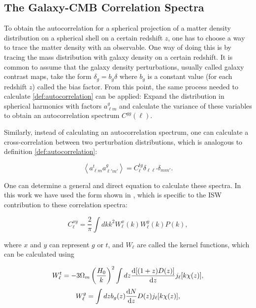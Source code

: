 \documentclass[openany,a4paper,12pt,oneside]{book}
\newcommand{\av}[1]{\left\langle #1 \right\rangle} %
\begin{document}
\begin{spacing}{1.5}
\subsection{The Galaxy-CMB Correlation Spectra}\label{ch2:correlations}

To obtain the autocorrelation for a spherical projection of a matter density distribution on a spherical shell on a certain redshift $z$, one has to choose a way to trace the matter density with an observable. One way of doing this is by tracing the mass distribution with galaxy density on a certain redshift. It is common to assume that the galaxy density perturbations, usually called galaxy contrast maps, take the form $\delta_g=b_g\delta$ where $b_g$ is a constant value (for each redshift $z$) called the bias factor. From this point, the same process needed to calculate \eqref{def:autocorrelation} can be applied: Expand the distribution in spherical harmonics with factors $a_{\ell m}^g$ and calculate the variance of these variables to obtain an autocorrelation spectrum $C^{gg}(\ell)$.

Similarly, instead of calculating an autocorrelation spectrum, one can calculate a cross-correlation between two perturbation distributions, which is analogous to definition \eqref{def:autocorrelation}:

\begin{equation}\label{av(ag, at)}
    \av{a_{\ell m}^ta_{\ell' m'}^g}=C^{tg}_\ell\delta_{\ell \ell'}\delta_{mm'}.
\end{equation}

One can determine a general and direct equation to calculate these spectra. In this work we have used the form shown in \cite{Moura-Santos_2016}, which is specific to the ISW contribution to these correlation spectra:

\begin{equation}\label{Cl_direct_calculation}
    C^{xy}_\ell=\frac{2}{\pi}\int dk k^2 W_\ell^x(k)W_\ell^y(k)P(k),
\end{equation}

\noindent where $x$ and $y$ can represent $g$ or $t$, and $W_\ell$ are called the kernel functions, which can be calculated using

\begin{equation}\label{Wt}
    W_\ell^t=-3\Omega_m\left(\frac{H_0}{k}\right)^2\int dz \dv{[(1+z)D(z)]}{z} j_\ell[k\chi(z)],
\end{equation}
\begin{equation}\label{Wg}
    W_\ell^g=\int dz b_g(z)\dv{N}{z}D(z)j_\ell[k\chi(z)],
\end{equation}


\end{spacing}
\end{document}

